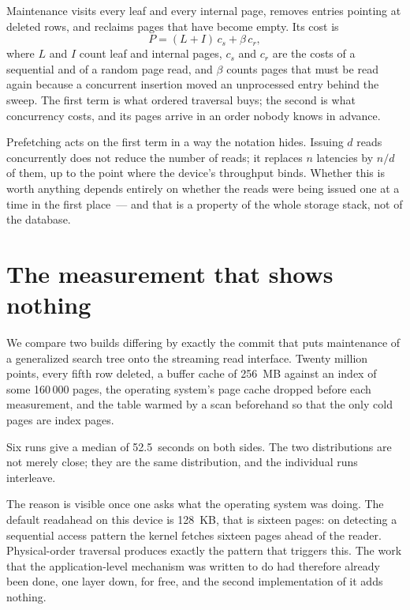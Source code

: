 Maintenance visits every leaf and every internal page, removes entries pointing
at deleted rows, and reclaims pages that have become empty. Its cost is
%
\begin{equation}
\label{eq:vac}
P = (L + I)\,c_s + \beta\,c_r ,
\end{equation}
%
where $L$ and $I$ count leaf and internal pages, $c_s$ and $c_r$ are the costs of
a sequential and of a random page read, and $\beta$ counts pages that must be
read again because a concurrent insertion moved an unprocessed entry behind the
sweep. The first term is what ordered traversal buys; the second is what
concurrency costs, and its pages arrive in an order nobody knows in advance.

Prefetching acts on the first term in a way the notation hides. Issuing $d$ reads
concurrently does not reduce the number of reads; it replaces $n$ latencies by
$n/d$ of them, up to the point where the device's throughput binds. Whether this
is worth anything depends entirely on whether the reads were being issued one at
a time in the first place~--- and that is a property of the whole storage stack,
not of the database.

\section{The measurement that shows nothing}
\label{sec:nogain}

We compare two builds differing by exactly the commit that puts maintenance of a
generalized search tree onto the streaming read interface. Twenty million points,
every fifth row deleted, a buffer cache of 256~MB against an index of some
160\,000 pages, the operating system's page cache dropped before each
measurement, and the table warmed by a scan beforehand so that the only cold
pages are index pages.

Six runs give a median of 52.5~seconds on both sides. The two distributions are
not merely close; they are the same distribution, and the individual runs
interleave.

The reason is visible once one asks what the operating system was doing. The
default readahead on this device is 128~KB, that is sixteen pages: on detecting a
sequential access pattern the kernel fetches sixteen pages ahead of the reader.
Physical-order traversal produces exactly the pattern that triggers this. The
work that the application-level mechanism was written to do had therefore already
been done, one layer down, for free, and the second implementation of it adds
nothing.

